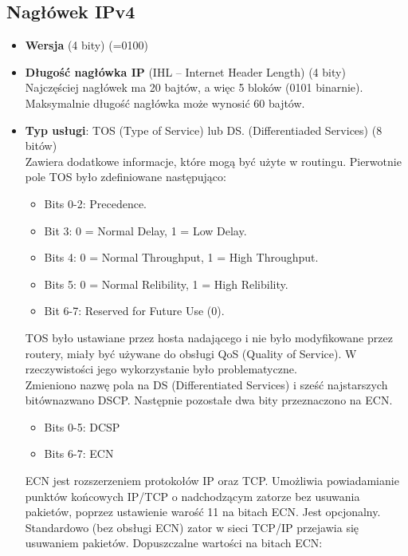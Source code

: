 \documentclass[../main.tex]{subfiles}
\begin{document}
    \subsection{Nagłówek IPv4}
    \begin{itemize}
        \item \textbf{Wersja} (4 bity) (=0100)
        \item \textbf{Długość nagłówka IP} (IHL – Internet Header Length) (4 bity)\\
        Najczęściej nagłówek ma 20 bajtów, a więc 5 bloków (0101 binarnie). Maksymalnie długość nagłówka może wynosić 60 bajtów.
        \item \textbf{Typ usługi}: TOS (Type of Service) lub DS. (Differentiaded Services) (8 bitów)\\
        Zawiera dodatkowe informacje, które mogą być użyte w routingu. Pierwotnie pole TOS było zdefiniowane następująco:
        \begin{itemize}
            \item Bits 0-2: Precedence.
            \item Bit 3: 0 = Normal Delay, 1 = Low Delay.
            \item Bits 4: 0 = Normal Throughput, 1 = High Throughput.
            \item Bits 5: 0 = Normal Relibility, 1 = High Relibility.
            \item Bit 6-7: Reserved for Future Use (0).
        \end{itemize}
        TOS było ustawiane przez hosta nadającego i nie było modyfikowane przez routery, miały być używane do obsługi QoS (Quality of Service). W rzeczywistości jego wykorzystanie było problematyczne.\\
        Zmieniono nazwę pola na DS (Differentiated Services) i sześć najstarszych bitównazwano DSCP. Następnie pozostałe dwa bity przeznaczono na ECN.
        \begin{itemize}
            \item Bits 0-5: DCSP
            \item Bits 6-7: ECN
        \end{itemize}
        ECN jest rozszerzeniem protokołów IP oraz TCP. Umożliwia powiadamianie punktów końcowych IP/TCP o nadchodzącym zatorze bez usuwania pakietów, poprzez ustawienie warość 11 na bitach ECN. Jest opcjonalny.\\
        Standardowo (bez obsługi ECN) zator w sieci TCP/IP przejawia się usuwaniem pakietów.
        Dopuszczalne wartości na bitach ECN:

\end{itemize}
\end{document}
